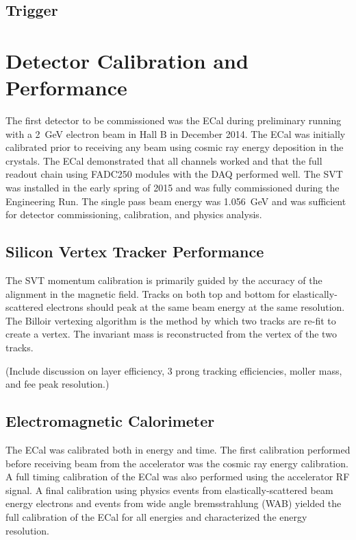 \documentclass[12pt]{report}
\begin{document}
\section{Trigger}


\chapter{Detector Calibration and Performance} 

The first detector to be commissioned was the ECal during preliminary running with a 2~GeV electron beam in Hall B in December 2014. The ECal was initially calibrated prior to receiving any beam using cosmic ray energy deposition in the crystals. The ECal demonstrated that all channels worked and that the full readout chain using FADC250 modules with the DAQ performed well. The SVT was installed in the early spring of 2015 and was fully commissioned during the Engineering Run. The single pass beam energy was 1.056~GeV and was sufficient for detector commissioning, calibration, and physics analysis. 

\section{Silicon Vertex Tracker Performance}

The SVT momentum calibration is primarily guided by the accuracy of the alignment in the magnetic field. Tracks on both top and bottom for elastically-scattered electrons should peak at the same beam energy at the same resolution. The Billoir vertexing algorithm is the method by which two tracks are re-fit to create a vertex. The invariant mass is reconstructed from the vertex of the two tracks. 

%

(Include discussion on layer efficiency, 3 prong tracking efficiencies, moller mass, and fee peak resolution.)

\section{Electromagnetic Calorimeter}

The ECal was calibrated both in energy and time. The first calibration performed before receiving beam from the accelerator was the cosmic ray energy calibration. A full timing calibration of the ECal was also performed using the accelerator RF signal. A final calibration using physics events from elastically-scattered beam energy electrons and events from wide angle bremsstrahlung (WAB) yielded the full calibration of the ECal for all energies and characterized the energy resolution. 
\end{document}
